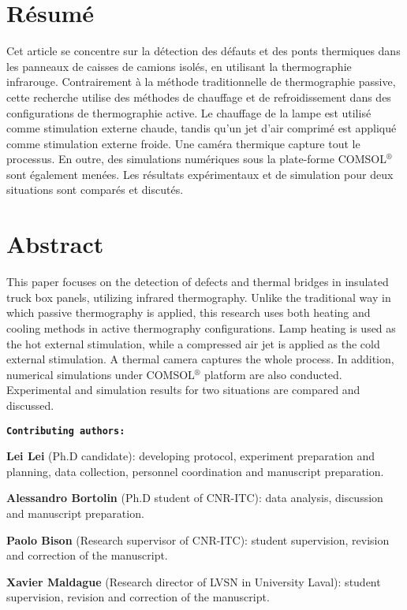 \section{Résumé}
Cet article se concentre sur la détection des défauts et des ponts thermiques dans les panneaux de caisses de camions isolés, en utilisant la thermographie infrarouge. Contrairement à la méthode traditionnelle de thermographie passive, cette recherche utilise des méthodes de chauffage et de refroidissement dans des configurations de thermographie active. Le chauffage de la lampe est utilisé comme stimulation externe chaude, tandis qu'un jet d'air comprimé est appliqué comme stimulation externe froide. Une caméra thermique capture tout le processus. En outre, des simulations numériques sous la plate-forme COMSOL$^®$ sont également menées. Les résultats expérimentaux et de simulation pour deux situations sont comparés et discutés.

\section{Abstract}
This paper focuses on the detection of defects and thermal bridges in insulated truck box panels, utilizing infrared thermography. Unlike the traditional way in which passive thermography is applied, this research uses both heating and cooling methods in active thermography configurations. Lamp heating is used as the hot external stimulation, while a compressed air jet is applied as the cold external stimulation. A thermal camera captures the whole process. In addition, numerical simulations under COMSOL$^®$ platform are also conducted. Experimental and simulation results for two situations are compared and discussed.

\textbf{\texttt{Contributing authors:}}

\textbf{\textsf{Lei Lei}} (Ph.D candidate): developing protocol, experiment preparation and planning, data collection, personnel coordination and manuscript preparation.

\textbf{Alessandro Bortolin} (Ph.D student of CNR-ITC): data analysis, discussion and manuscript preparation.

\textbf{Paolo Bison} (Research supervisor of CNR-ITC): student supervision, revision and correction of the manuscript. 

\textbf{Xavier Maldague} (Research director of LVSN in University Laval): student supervision, revision and correction of the manuscript. 


